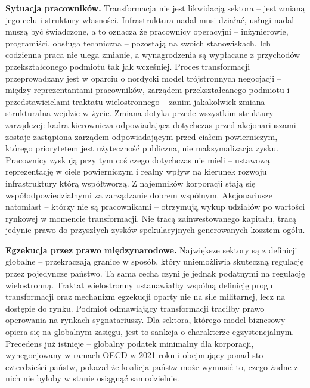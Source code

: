 \documentclass[12pt,a4paper]{article}
\begin{document}
\textbf{Sytuacja pracowników.} Transformacja nie jest likwidacją sektora
-- jest zmianą jego celu i struktury własności. Infrastruktura nadal musi
działać, usługi nadal muszą być świadczone, a to oznacza że pracownicy
operacyjni -- inżynierowie, programiści, obsługa techniczna -- pozostają
na swoich stanowiskach. Ich codzienna praca nie ulega zmianie, a
wynagrodzenia są wypłacane z przychodów przekształconego podmiotu tak
jak wcześniej. Proces transformacji przeprowadzany jest w oparciu o nordycki
model trójstronnych negocjacji -- między reprezentantami pracowników,
zarządem przekształcanego podmiotu i przedstawicielami traktatu
wielostronnego -- zanim jakakolwiek zmiana strukturalna wejdzie w życie.
Zmiana dotyka przede wszystkim struktury zarządczej: kadra kierownicza
odpowiadająca dotychczas przed akcjonariuszami zostaje zastąpiona zarządem
odpowiadającym przed ciałem powierniczym, którego priorytetem jest
użyteczność publiczna, nie maksymalizacja zysku. Pracownicy zyskują przy
tym coś czego dotychczas nie mieli -- ustawową reprezentację w ciele
powierniczym i realny wpływ na kierunek rozwoju infrastruktury którą
współtworzą. Z najemników korporacji stają się współodpowiedzialnymi za
zarządzanie dobrem wspólnym. Akcjonariusze natomiast -- którzy nie są
pracownikami -- otrzymują wykup udziałów po wartości rynkowej w momencie
transformacji. Nie tracą zainwestowanego kapitału, tracą jedynie prawo do
przyszłych zysków spekulacyjnych generowanych kosztem ogółu.

\textbf{Egzekucja przez prawo międzynarodowe.} Największe sektory
są z definicji globalne -- przekraczają granice w sposób, który uniemożliwia
skuteczną regulację przez pojedyncze państwo. Ta sama cecha czyni je jednak
podatnymi na regulację wielostronną. Traktat wielostronny ustanawiałby
wspólną definicję progu transformacji oraz mechanizm egzekucji oparty nie
na sile militarnej, lecz na dostępie do rynku. Podmiot odmawiający
transformacji traciłby prawo operowania na rynkach sygnatariuszy. Dla
sektora, którego model biznesowy opiera się na globalnym zasięgu, jest to
sankcja o charakterze egzystencjalnym. Precedens już istnieje -- globalny
podatek minimalny dla korporacji, wynegocjowany w ramach OECD w 2021
roku i obejmujący ponad sto czterdzieści państw, pokazał że koalicja państw
może wymusić to, czego żadne z nich nie byłoby w stanie osiągnąć samodzielnie.
\end{document}
